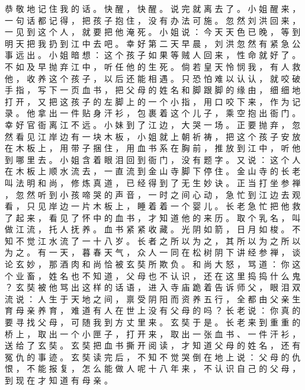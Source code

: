 {恭 敬 地 记 住 我 的 话 。
快 醒 ， 快 醒 。
说 完 就 离 去 了 。
小 姐 醒 来 ， 一 句 话 都 记 得 ， 把 孩 子 抱 住 ， 没 有 办 法 可 施 。
忽 然 刘 洪 回 来 ， 一 见 到 这 个 人 ， 就 要 把 他 淹 死 。
小 姐 说 ： 今 天 天 色 已 晚 ， 等 到 明 天 把 我 扔 到 江 中 去 吧 。
幸 好 第 二 天 早 晨 ， 刘 洪 忽 然 有 紧 急 公 事 远 出 。
小 姐 暗 想 ： 这 个 孩 子 如 果 等 贼 人 回 来 ， 性 命 就 好 了 。
不 如 及 早 抛 弃 江 中 ， 听 任 他 的 生 死 。
倘 若 皇 天 怜 悯 我 ， 有 人 救 他 ， 收 养 这 个 孩 子 ， 以 后 还 能 相 遇 。
只 恐 怕 难 以 认 认 ， 就 咬 破 手 指 ， 写 下 一 页 血 书 ， 把 父 母 的 姓 名 和 脚 跟 脚 的 缘 由 ， 细 细 地 打 开 ， 又 把 这 孩 子 的 左 脚 上 的 一 个 小 指 ， 用 口 咬 下 来 ， 作 为 记 录 。
他 拿 出 一 件 贴 身 汗 衫 ， 包 裹 着 这 个 儿 子 ， 乘 空 抱 出 衙 门 。
幸 好 官 衙 离 江 不 远 。
小 妹 到 了 江 边 ， 大 哭 一 场 。
正 要 抛 弃 ， 忽 然 看 见 江 岸 边 有 一 块 木 板 ， 小 姐 就 上 朝 祈 祷 ， 把 这 个 孩 子 安 放 在 木 板 上 ， 用 带 子 捆 住 ， 用 血 书 系 在 胸 前 ， 推 放 到 江 中 ， 听 他 到 哪 里 去 。
小 姐 含 着 眼 泪 回 到 衙 门 ， 没 有 题 字 。
又 说 ： 这 个 人 在 木 板 上 顺 水 流 去 ， 一 直 流 到 金 山 寺 脚 下 停 住 。
金 山 寺 的 长 老 叫 法 明 和 尚 ， 修 炼 真 道 ， 已 经 得 到 了 无 生 妙 诀 。
正 当 打 坐 参 禅 ， 忽 然 听 到 小 孩 啼 哭 的 声 音 ， 一 时 之 间 心 动 ， 急 忙 到 江 边 去 观 看 ， 只 见 岸 边 一 片 木 板 上 ， 睡 着 着 一 个 婴 儿 。
长 老 急 忙 把 他 救 了 起 来 ， 看 见 了 怀 中 的 血 书 ， 才 知 道 他 的 来 历 。
取 个 乳 名 ， 叫 做 江 流 ， 托 人 抚 养 。
血 书 紧 紧 收 藏 。
光 阴 如 箭 ， 日 月 如 梭 。
不 知 不 觉 江 水 流 了 一 十 八 岁 。
长 者 之 所 以 为 之 ， 其 所 以 为 之 所 以 为 之 。
有 一 天 ， 暮 春 天 气 ， 众 人 一 同 在 松 树 阴 下 讲 经 参 禅 ， 谈 论 玄 妙 ， 那 酒 肉 和 尚 恰 被 玄 奘 所 欺 负 。
和 尚 大 怒 ， 骂 道 ： 你 这 个 业 畜 ， 姓 名 也 不 知 道 ， 父 母 也 不 认 识 ， 还 在 这 里 捣 捣 什 么 鬼 ？ 玄 奘 被 他 骂 出 这 样 的 话 语 ， 进 入 寺 庙 跪 着 告 诉 师 父 ， 眼 泪 双 流 说 ： 人 生 于 天 地 之 间 ， 禀 受 阴 阳 而 资 养 五 行 ， 全 都 由 父 亲 生 育 母 亲 养 育 ， 难 道 有 人 在 世 上 没 有 父 母 的 吗 ？
长 老 说 ： 你 真 的 要 寻 找 父 母 ， 可 随 我 到 方 丈 里 来 。
玄 奘 于 是 。
长 老 来 到 重 重 的 桥 上 ， 取 出 一 个 小 匣 子 ， 打 开 来 ， 取 出 一 张 血 书 、 一 件 汗 衫 ， 送 给 了 玄 奘 。
玄 奘 把 血 书 撕 开 阅 读 ， 才 知 道 父 母 的 姓 名 ， 还 有 冤 仇 的 事 迹 。
玄 奘 读 完 后 ， 不 知 不 觉 哭 倒 在 地 上 说 ： 父 母 的 仇 恨 ， 不 能 报 复 ， 怎 么 能 做 人 呢 十 八 年 来 ， 不 认 识 自 己 的 父 母 ， 到 现 在 才 知 道 有 母 亲 。
}
